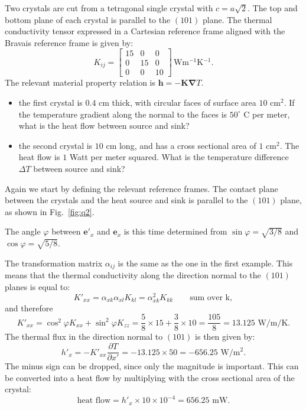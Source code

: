 \begin{example}
Two crystals are cut from a tetragonal single crystal with $c=a\sqrt{2}$.  The top and bottom plane of each crystal
is parallel to the $(101)$ plane.  The thermal conductivity tensor expressed in a Cartesian reference frame aligned 
with the Bravais reference frame is given by:
\[
	K_{ij} = \left[\begin{matrix}
	15&0&0\\
	0&15&0\\
	0&0&10\end{matrix}\right]\,\text{Wm$^{-1}$K$^{-1}$}.
\]
The relevant material property relation is $\mathbf{h} = -\bm{K}\bm{\nabla}T$.
\begin{itemize}
	\item the first crystal is $0.4$ cm thick, with circular faces of surface area $10$ cm$^2$.  If the temperature
	gradient along the normal to the faces is $50^{\circ}$ C per meter, what is the heat flow between source
	and sink?
	\item the second crystal is $10$ cm long, and has a cross sectional area of $1$ cm$^2$.  The heat flow is $1$ Watt 
	per meter squared.  What is the temperature difference $\Delta T$ between source and sink?
\end{itemize}

Again we start by defining the relevant reference frames.  The contact plane between the crystals and the heat source
and sink is parallel to the $(101)$ plane, as shown in Fig.~\ref{fig:q2}.


The angle $\varphi$ between $\mathbf{e}'_x$ and $\mathbf{e}_x$ is this time determined from $\sin\varphi=
\sqrt{3/8}$ and $\cos\varphi=\sqrt{5/8}$.

The transformation matrix ${\alpha}_{ij}$ is the same as the one in the first example.  This means that the thermal 
conductivity along the direction normal to the $(101)$ planes is equal to:
\[
	K'_{xx} ={\alpha}_{xk}{\alpha}_{xl}K_{kl} ={\alpha}^2_{xk}K_{kk}\qquad\text{sum over k},
\]
and therefore
\[
	K'_{xx} = \cos^2\varphi K_{xx} + \sin^2\varphi K_{zz}= \frac{5}{8}\times 15 + \frac{3}{8}\times 10 =  
	\frac{105}{8} = 13.125\,\,\text{W/m/K}.
\]
The thermal flux in the direction normal to $(101)$ is then given by:
\[
	h'_x = -K'_{xx} \frac{\partial T}{\partial x'} = -13.125 \times 50 = -656.25\,\,\text{W/m$^2$}.
\]
The minus sign can be dropped, since only the magnitude is important.
This can be converted into a heat flow by multiplying with the cross sectional area of the crystal:
\[
	\text{heat flow} = h'_x \times 10\times 10^{-4} = 656.25\,\,\text{mW}.
\]


\end{example}
